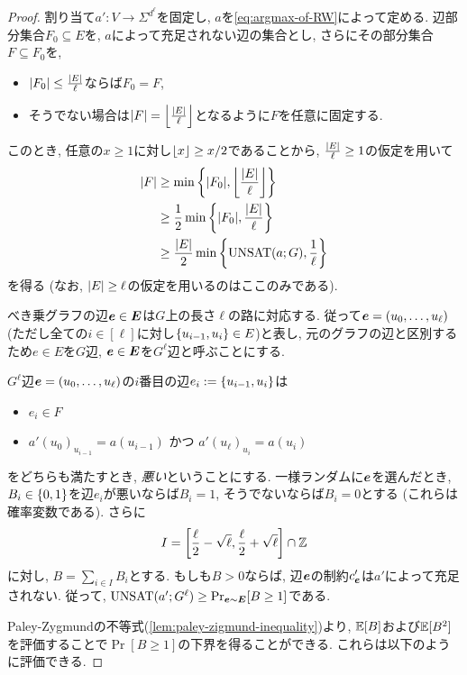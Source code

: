 \begin{proof}
割り当て$a'\colon V\to \Sigma^{d^{\ell}}$を固定し, $a$を\cref{eq:argmax-of-RW}によって定める.
辺部分集合$F_0\subseteq E$を, $a$によって充足されない辺の集合とし,
さらにその部分集合$F\subseteq F_0$を, 
\begin{itemize}
\item $\abs{F_0} \le \frac{\abs{E}}{\ell}$ならば$F_0=F$,
\item そうでない場合は$\abs{F} = \floor*{\frac{\abs{E}}{\ell}}$となるように$F$を任意に固定する.
\end{itemize}
このとき, 任意の$x\ge 1$に対し$\floor{x}\ge x/2$であることから, $\frac{\abs{E}}{\ell}\ge 1$の仮定を用いて
\begin{align}
  \abs{F} &\ge \min\qty{ \abs{F_0}, \floor*{\frac{\abs{E}}{\ell}} } \nonumber \\
  &\ge \frac{1}{2}\min\qty{ \abs{F_0}, \frac{\abs{E}}{\ell} } \nonumber \\
  &\ge \frac{\abs{E}}{2}\min\qty{ \UNSAT(a;G), \frac{1}{\ell} } \label{eq:abs-F}
\end{align}
を得る (なお, $\abs{E}\ge \ell$の仮定を用いるのはここのみである).

べき乗グラフの辺$\bolde \in \boldE$は$G$上の長さ$\ell$の路に対応する.
従って$\bolde = (u_0,\dots,u_\ell)$ (ただし全ての$i\in[\ell]$に対し$\qty{u_{i-1},u_{i}}\in E$)と表し, 元のグラフの辺と区別するため$e\in E$を$G$辺, $\bolde\in\boldE$を$G^\ell$辺と呼ぶことにする.

$G^\ell$辺$\bolde=(u_0,\dots,u_\ell)$の$i$番目の辺$e_i:=\qty{u_{i-1},u_i}$は
\begin{itemize}
  \item $e_i \in F$
  \item $a'(u_{0})_{u_{i-1}} = a(u_{i-1})$ かつ $a'(u_\ell)_{u_i} = a(u_i)$
\end{itemize}
をどちらも満たすとき, \emph{悪い}ということにする.
一様ランダムに$\bolde$を選んだとき, $B_i\in\binset$を辺$e_i$が悪いならば$B_i=1$, そうでないならば$B_i=0$とする (これらは確率変数である).
さらに
\begin{align*}
  I = \qty[\frac{\ell}{2} - \sqrt{\ell}, \frac{\ell}{2} + \sqrt{\ell}] \cap \mathbb{Z}
\end{align*}
に対し, $B=\sum_{i\in I}B_i$とする.
もしも$B>0$ならば, 辺$\bolde$の制約$c'_{\bolde}$は$a'$によって充足されない.
従って, $\UNSAT(a';G^\ell) \ge \Pr_{\bolde\sim \boldE}[B\ge 1]$である.

Paley-Zygmundの不等式(\cref{lem:paley-zigmund-inequality})より, $\E[B]$および$\E[B^2]$を評価することで$\Pr[B\ge 1]$の下界を得ることができる.
これらは以下のように評価できる. 


\end{proof}
